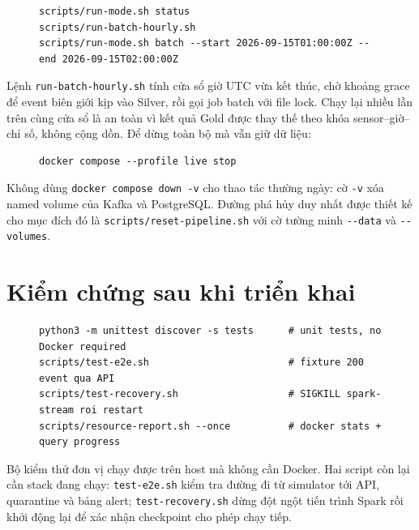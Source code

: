 \begin{figure}[H]
\label{lst:batch-stop}
\begin{lstlisting}[basicstyle=\ttfamily\footnotesize,frame=single]
scripts/run-mode.sh status
scripts/run-batch-hourly.sh
scripts/run-mode.sh batch --start 2026-09-15T01:00:00Z --end 2026-09-15T02:00:00Z
\end{lstlisting}
\end{figure}

Lệnh \texttt{run-batch-hourly.sh} tính cửa sổ giờ UTC vừa kết thúc, chờ khoảng
grace để event biên giới kịp vào Silver, rồi gọi job batch với file lock. Chạy
lại nhiều lần trên cùng cửa sổ là an toàn vì kết quả Gold được thay thế theo
khóa sensor--giờ--chỉ số, không cộng dồn. Để dừng toàn bộ mà vẫn giữ dữ liệu:

\begin{figure}[H]
\label{lst:stop}
\begin{lstlisting}[basicstyle=\ttfamily\footnotesize,frame=single]
docker compose --profile live stop
\end{lstlisting}
\end{figure}

Không dùng \texttt{docker compose down -v} cho thao tác thường ngày: cờ
\texttt{-v} xóa named volume của Kafka và PostgreSQL. Đường phá hủy duy nhất
được thiết kế cho mục đích đó là \texttt{scripts/reset-pipeline.sh} với cờ
tường minh \texttt{-{}-data} và \texttt{-{}-volumes}.

\section{Kiểm chứng sau khi triển khai}

\begin{figure}[H]
\label{lst:verify}
\begin{lstlisting}[basicstyle=\ttfamily\footnotesize,frame=single]
python3 -m unittest discover -s tests      # unit tests, no Docker required
scripts/test-e2e.sh                        # fixture 200 event qua API
scripts/test-recovery.sh                   # SIGKILL spark-stream roi restart
scripts/resource-report.sh --once          # docker stats + query progress
\end{lstlisting}
\end{figure}

Bộ kiểm thử đơn vị chạy được trên host mà không cần Docker. Hai script còn lại
cần stack đang chạy: \texttt{test-e2e.sh} kiểm tra đường đi từ simulator tới
API, quarantine và bảng alert; \texttt{test-recovery.sh} dừng đột ngột tiến
trình Spark rồi khởi động lại để xác nhận checkpoint cho phép chạy tiếp.

